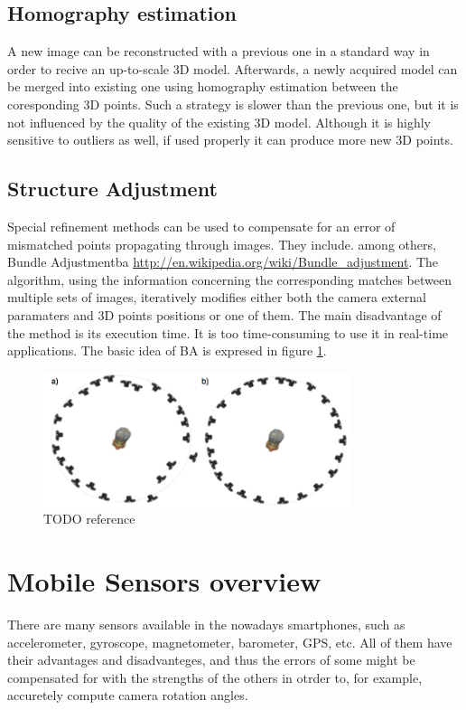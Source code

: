 \subsection{Homography estimation}
A new image can be reconstructed with a previous one in a standard way in order to recive an up-to-scale 3D model. Afterwards, a newly acquired model can be merged into existing one using homography estimation between the coresponding 3D points. Such a strategy is slower than the previous one, but it is not influenced by the quality of the existing 3D model. Although it is highly sensitive to outliers as well, if used properly it can produce more new 3D points.
\subsection{Structure Adjustment}
Special refinement methods can be used to compensate for an error of mismatched points propagating through images. They include. among others, Bundle Adjustment\gls{ba} \url{http://en.wikipedia.org/wiki/Bundle_adjustment}. The algorithm, using the information concerning the corresponding matches between multiple sets of images, iteratively modifies either both the camera external paramaters and 3D points positions or one of them. The main disadvantage of the method is its execution time. It is too time-consuming to use it in real-time applications. The basic idea of BA is expresed in figure \ref{fig:BundleAdjustment}.
\begin{figure}[p]
    \centering
    \includegraphics[width=0.8\textwidth]{BundleAdjustment}
    \caption{TODO reference}
    \label{fig:BundleAdjustment}
\end{figure}
\section{Mobile Sensors overview}
There are many sensors available in the nowadays smartphones, such as accelerometer, gyroscope, magnetometer, barometer, GPS, etc. All of them have their advantages and disadvanteges, and thus the errors of some might be compensated for with the strengths of the others in otrder to, for example, accuretely compute camera rotation angles.
